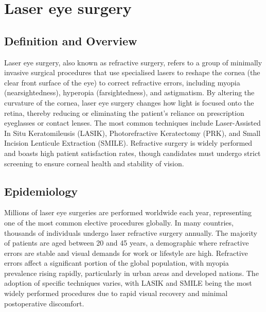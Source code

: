 \chapter{Laser eye surgery}

\section*{Definition and Overview}
Laser eye surgery, also known as refractive surgery, refers to a group of minimally invasive surgical procedures that use specialised lasers to reshape the cornea (the clear front surface of the eye) to correct refractive errors, including myopia (nearsightedness), hyperopia (farsightedness), and astigmatism. By altering the curvature of the cornea, laser eye surgery changes how light is focused onto the retina, thereby reducing or eliminating the patient's reliance on prescription eyeglasses or contact lenses. The most common techniques include Laser-Assisted In Situ Keratomileusis (LASIK), Photorefractive Keratectomy (PRK), and Small Incision Lenticule Extraction (SMILE). Refractive surgery is widely performed and boasts high patient satisfaction rates, though candidates must undergo strict screening to ensure corneal health and stability of vision.

\section*{Epidemiology}
Millions of laser eye surgeries are performed worldwide each year, representing one of the most common elective procedures globally. In many countries, thousands of individuals undergo laser refractive surgery annually. The majority of patients are aged between 20 and 45 years, a demographic where refractive errors are stable and visual demands for work or lifestyle are high. Refractive errors affect a significant portion of the global population, with myopia prevalence rising rapidly, particularly in urban areas and developed nations. The adoption of specific techniques varies, with LASIK and SMILE being the most widely performed procedures due to rapid visual recovery and minimal postoperative discomfort.

